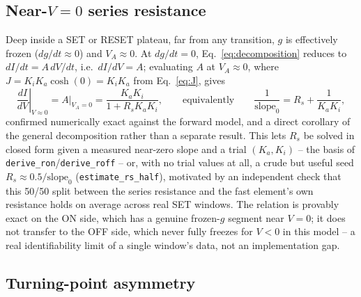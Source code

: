 \documentclass[11pt]{article}
\begin{document}
\subsection{Near-$V=0$ series resistance}

Deep inside a SET or RESET plateau, far from any transition, $g$ is
effectively frozen ($dg/dt \approx 0$) and $V_A \approx 0$. At $dg/dt=0$,
Eq.~\eqref{eq:decomposition} reduces to $dI/dt = A\,dV/dt$, i.e.\
$dI/dV = A$; evaluating $A$ at $V_A \approx 0$, where
$J = K_i K_a \cosh(0) = K_i K_a$ from Eq.~\eqref{eq:J}, gives
\begin{equation}
\left.\frac{dI}{dV}\right|_{V\approx 0} = A\big|_{V_A=0} = \frac{K_a K_i}{1 + R_s K_a K_i},
\qquad\text{equivalently}\qquad
\frac{1}{\text{slope}_0} = R_s + \frac{1}{K_a K_i},
\label{eq:nearzero}
\end{equation}
confirmed numerically exact against the forward model, and a direct
corollary of the general decomposition rather than a separate result. This
lets $R_s$ be solved in closed form given a measured near-zero slope and a
trial $(K_a, K_i)$ -- the basis of \texttt{derive\_ron}/\texttt{derive\_roff}
-- or, with no trial values at all, a crude but useful seed
$R_s \approx 0.5/\text{slope}_0$ (\texttt{estimate\_rs\_half}), motivated by
an independent check that this 50/50 split between the series resistance
and the fast element's own resistance holds on average across real SET
windows. The relation is provably exact on the ON side, which has a
genuine frozen-$g$ segment near $V=0$; it does not transfer to the OFF
side, which never fully freezes for $V<0$ in this model -- a real
identifiability limit of a single window's data, not an implementation
gap.

\subsection{Turning-point asymmetry}
\end{document}
